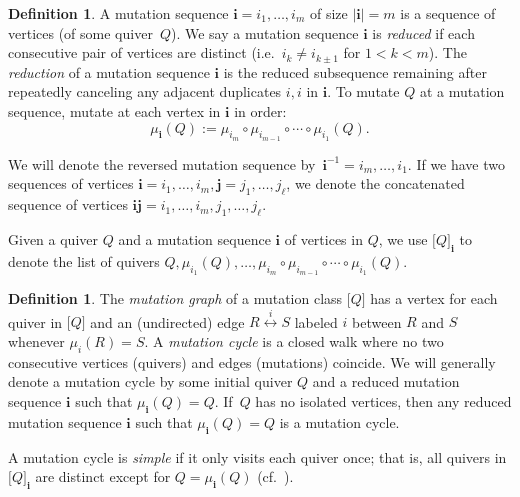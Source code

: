 \documentclass[11pt, letterpaper]{amsart}
\theoremstyle{definition}
\newtheorem{definition}[theorem]{Definition}
\numberwithin{equation}{section}
\newcommand{\mutation}[1]{\stackrel{#1}{\longleftrightarrow}}%
\begin{document}
\begin{definition}
A mutation sequence $\mathbf{i} = i_1, \ldots, i_m$ of size $|\mathbf{i}| = m$ is a sequence of vertices (of some quiver~$Q$). 
We say a mutation sequence $\mathbf{i}$ is \emph{reduced} if each consecutive pair of vertices are distinct (i.e.\ $i_k \neq i_{k \pm 1}$ for $1 < k < m$).
The \emph{reduction} of a mutation sequence $\mathbf i$ is the reduced subsequence remaining after repeatedly canceling any adjacent duplicates $i, i$ in $\mathbf i$. %
To mutate $Q$ at a mutation sequence, mutate at each vertex in $\mathbf{i}$ in order:
\[
\mu_{\mathbf i}(Q) := \mu_{i_m} \circ \mu_{i_{m-1}} \circ \cdots \circ \mu_{i_1}(Q).
\]

We will denote the reversed mutation sequence by~$\mathbf i^{-1} = i_m, \ldots, i_1$.
If we have two sequences of vertices $\mathbf i = i_1, \ldots, i_m, \mathbf j = j_1, \ldots, j_\ell$, we denote the concatenated sequence of vertices $\mathbf i \mathbf j = i_1, \ldots, i_m, j_1, \ldots, j_\ell$.

Given a quiver $Q$ and a mutation sequence $\mathbf{i}$ of vertices in $Q$, we use $\big [ Q \big ]_{\mathbf{i}}$ to denote the list of quivers $Q, \mu_{i_1}(Q), \ldots, \mu_{i_m} \circ \mu_{i_{m-1}} \circ \cdots \circ \mu_{i_1}(Q)$. %
\end{definition}

\begin{definition}
\label{def:mugraph}
The \emph{mutation graph} of a mutation class $\big [ Q \big ]$ has a vertex for each quiver in $\big [ Q \big ]$ and an (undirected) edge $R \mutation{i} S$ labeled $i$ between $R$ and $S$ whenever $\mu_i(R) = S$. A \emph{mutation cycle} is a closed walk where no two consecutive vertices (quivers) and edges (mutations) coincide. 
We will generally denote a mutation cycle by some initial quiver $Q$ and a reduced mutation sequence $\mathbf{i}$ such that $\mu_{\mathbf i}(Q) = Q.$
If~$Q$ has no isolated vertices, then any reduced mutation sequence $\mathbf i$ such that $\mu_{\mathbf i}(Q)=Q$ is a mutation cycle.

A mutation cycle is \emph{simple} if it only visits each quiver once; that is, all quivers in $\big [ Q \big ]_{\mathbf i}$ are distinct except for $Q = \mu_{\mathbf i}(Q)$ (cf.\ \cite[Definition~5.1]{LMC}). 

\end{definition}
\end{document}
